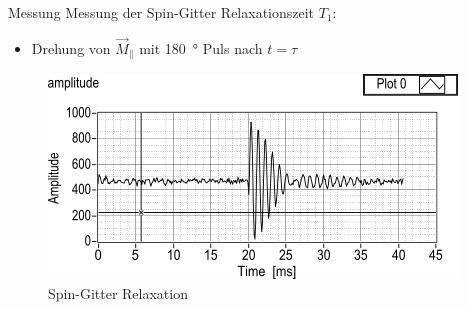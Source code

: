 \begin{frame}{Messung}
Messung der Spin-Gitter Relaxationszeit $T_1$:
\begin{itemize}
\item Drehung von $\vec{M}_\parallel$ mit \SI{180}{\degree} Puls nach $t=\tau$
\end{itemize}
	\begin{figure}
	\centering
	\includegraphics[scale=.65]{images//spinlattice.png}
	\caption{Spin-Gitter Relaxation \cite{script_nmr}}
	\end{figure}
\end{frame}


